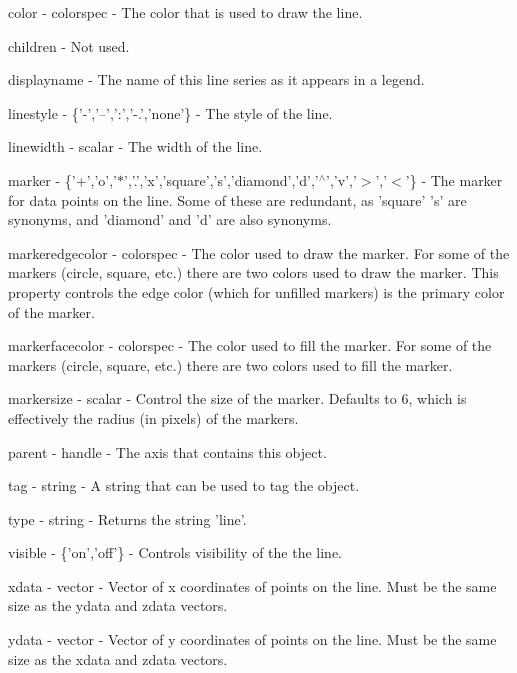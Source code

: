 \begin{DoxyItemize}
\item {\ttfamily color} -\/ {\ttfamily colorspec} -\/ The color that is used to draw the line.  
\item {\ttfamily children} -\/ Not used.  
\item {\ttfamily displayname} -\/ The name of this line series as it appears in a legend.  
\item {\ttfamily linestyle} -\/ {\ttfamily \{'-\/','--','\-:','-\/.','none'\}} -\/ The style of the line.  
\item {\ttfamily linewidth} -\/ {\ttfamily scalar} -\/ The width of the line.  
\item {\ttfamily marker} -\/ {\ttfamily \{'+','o','$\ast$','.','x','square','s','diamond','d','$^\wedge$','v','$>$','$<$'\}} -\/ The marker for data points on the line. Some of these are redundant, as {\ttfamily 'square'} {\ttfamily 's'} are synonyms, and {\ttfamily 'diamond'} and {\ttfamily 'd'} are also synonyms.  
\item {\ttfamily markeredgecolor} -\/ {\ttfamily colorspec} -\/ The color used to draw the marker. For some of the markers (circle, square, etc.) there are two colors used to draw the marker. This property controls the edge color (which for unfilled markers) is the primary color of the marker.  
\item {\ttfamily markerfacecolor} -\/ {\ttfamily colorspec} -\/ The color used to fill the marker. For some of the markers (circle, square, etc.) there are two colors used to fill the marker.  
\item {\ttfamily markersize} -\/ {\ttfamily scalar} -\/ Control the size of the marker. Defaults to 6, which is effectively the radius (in pixels) of the markers.  
\item {\ttfamily parent} -\/ {\ttfamily handle} -\/ The axis that contains this object.  
\item {\ttfamily tag} -\/ {\ttfamily string} -\/ A string that can be used to tag the object.  
\item {\ttfamily type} -\/ {\ttfamily string} -\/ Returns the string {\ttfamily 'line'}.  
\item {\ttfamily visible} -\/ {\ttfamily \{'on','off'\}} -\/ Controls visibility of the the line.  
\item {\ttfamily xdata} -\/ {\ttfamily vector} -\/ Vector of x coordinates of points on the line. Must be the same size as the {\ttfamily ydata} and {\ttfamily zdata} vectors.  
\item {\ttfamily ydata} -\/ {\ttfamily vector} -\/ Vector of y coordinates of points on the line. Must be the same size as the {\ttfamily xdata} and {\ttfamily zdata} vectors.  

\end{DoxyItemize}
